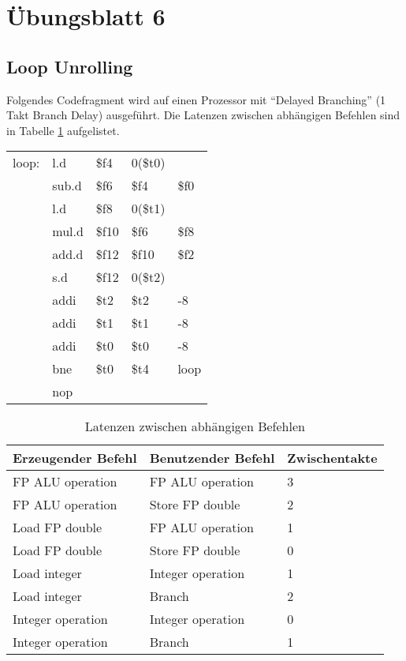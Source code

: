\pagebreak
\section{Übungsblatt 6}
\setcounter{subsection}{4}
\subsection{Loop Unrolling}
Folgendes Codefragment wird auf einen Prozessor mit "`Delayed Branching"' (1 Takt Branch Delay) ausgeführt. Die Latenzen zwischen abhängigen Befehlen sind in Tabelle \ref{tbl:stalls1} aufgelistet.

{
	\ttfamily
	\begin{tabular}{l llll}
		loop: & l.d   & \$f4  & 0(\$t0) &      \\
		      & sub.d & \$f6  & \$f4    & \$f0 \\
		      & l.d   & \$f8  & 0(\$t1) &      \\
		      & mul.d & \$f10 & \$f6    & \$f8 \\
		      & add.d & \$f12 & \$f10   & \$f2 \\
		      & s.d   & \$f12 & 0(\$t2) &      \\
		      & addi  & \$t2  & \$t2    & -8   \\
		      & addi  & \$t1  & \$t1    & -8   \\
		      & addi  & \$t0  & \$t0    & -8   \\
		      & bne   & \$t0  & \$t4    & loop \\
		      & nop   &       &         &
	\end{tabular}
}

\begin{table}[h!]
	\centering
	\begin{tabular}{lll}
		\hline
		Erzeugender Befehl & Benutzender Befehl & Zwischentakte \\ \hline
		FP ALU operation   & FP ALU operation   & 3             \\
		FP ALU operation   & Store FP double    & 2             \\
		Load FP double     & FP ALU operation   & 1             \\
		Load FP double     & Store FP double    & 0             \\
		Load integer       & Integer operation  & 1             \\
		Load integer       & Branch             & 2             \\
		Integer operation  & Integer operation  & 0             \\
		Integer operation  & Branch             & 1             \\ \hline
	\end{tabular}
	\caption{Latenzen zwischen abhängigen Befehlen}
	\label{tbl:stalls1}
\end{table}

